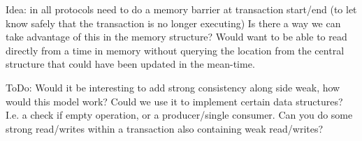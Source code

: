 \documentclass[11pt,letterpaper]{article}
\begin{document}
Idea: in all protocols need to do a memory barrier at transaction start/end (to let know safely that the transaction is no longer executing)
Is there a way we can take advantage of this in the memory structure?
Would want to be able to read directly from a time in memory without querying the location from the central structure that could have been updated
in the mean-time.


ToDo: Would it be interesting to add strong consistency along side weak, how would this model work?  Could we use it to implement
certain data structures?
I.e. a check if empty operation, or a producer/single consumer.
Can you do some strong read/writes within a transaction also containing weak read/writes?
\end{document}
